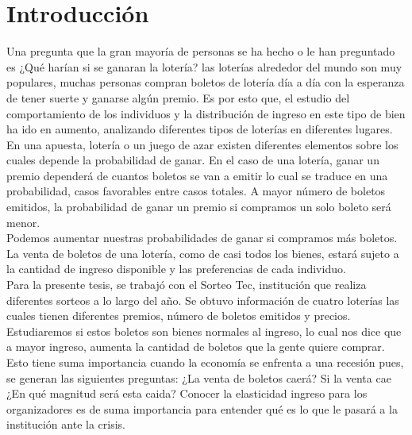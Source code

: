 \chapter*{Introducción}


\noindent Una pregunta que la gran mayoría de personas se ha hecho o le han preguntado es ¿Qué harían si se ganaran la lotería? las loterías alrededor del mundo son muy populares, muchas personas compran boletos de lotería día a día con la esperanza de tener suerte y ganarse algún premio. Es por esto que, el estudio del comportamiento de los individuos y la distribución de ingreso en este tipo de bien ha ido en aumento, analizando diferentes tipos de loterías en diferentes lugares.  \\

En una apuesta, lotería o un juego de azar existen diferentes elementos sobre los cuales depende la probabilidad de ganar. En el caso de una lotería, ganar un premio dependerá de cuantos boletos se van a emitir lo cual se traduce en una probabilidad, casos favorables entre casos totales. A mayor número de boletos emitidos, la probabilidad de ganar un premio si compramos un solo boleto será menor. \\

Podemos aumentar nuestras probabilidades de ganar si compramos más boletos. La venta de boletos de una lotería, como de casi todos los bienes, estará sujeto a la cantidad de ingreso disponible y las preferencias de cada individuo. \\

Para la presente tesis, se trabajó con el Sorteo Tec, institución que realiza diferentes sorteos a lo largo del año. Se obtuvo información de cuatro loterías las cuales tienen diferentes premios, número de boletos emitidos y precios. Estudiaremos si estos boletos son bienes normales al ingreso, lo cual nos dice que a mayor ingreso, aumenta la cantidad de boletos que la gente quiere comprar. Esto tiene suma importancia cuando la economía se enfrenta a una recesión pues, se generan las siguientes preguntas: ¿La venta de boletos caerá? Si la venta cae ¿En qué magnitud será esta caida? Conocer la elasticidad ingreso para los organizadores es de suma importancia para entender qué es lo que le pasará a la institución ante la crisis. \\

